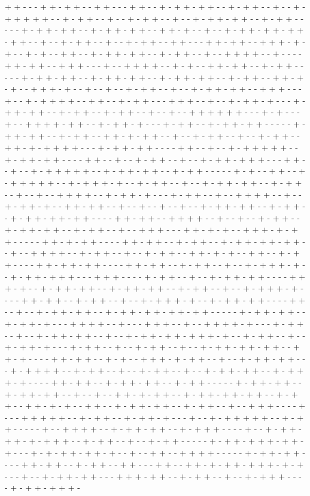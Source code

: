 + + - - - + + - + + - - + + - - - + + - - + - + + - + + - - + - + + - - + - - + - + + + + + - - + - + + - - + - - + - + + - - + - - + - + + - + + - - + - + + - - - - - + - + + - + + - - + - + + - + + - - + + - + - - + - - + - + + - + + - + + - + + - - + - - + - + + - - + - - + - + + - - + + - - - + + - + + - - + + + - + - + - - + - + - - + + - - + - + + - + + - - + - + + - - + - - + + + + - - + - - - - + + - + + - - + + + - - - + - - + + + + - - + - + - - + + - + + - - + - + + - - - - - + - + + - + + - - + - + + - + + - - + - + + - + + - - + - + + - - + + - + - + - - + + + - + - - + - - + - - + - + + - - + - - + - + + - + + - - + + + - - - + - - + - + + + + - - + + - - + - + + - - - + + + - - + - - + - + + - + - - - + - + + - + + - - + - + + - - + - + + - - + - - + - - + + + + + + - - - + - + - - - + - - + + + + - + + - - + - + + - + - - - + - + + - - + - + + - + + - - - - - + - + + - + + - - + - + + - - + + - + - + + - - + - - + - + + - - + - - + - + + - - + + - + - + + + + - - - + - + + - + + - - - - + + - - + - - + - + + + + + - - + - + + - + + - - - - + + - - + - - + - + + - - + - - + - + + - + + + - - - + + - - + - - + - + + + + + - - + - + + - + + - - + - + + - - - - - + - + - - + + - - + - + + + + + - - + - + + + - + - - + - + + - - + - - + - + + - + + - - + - + + - - + - - + - - + + + + - - + - + + - + - - - + - + + - - + - - + + + + - - + - - + - + + - + - - + + - + + - - + - - + - - + - - + - - + - + + - + + - - + - + + - - + - + + - + + - + + - - - - + + - + + - - + + + + - - + - - + - - + - + + - - + - + + - + + - - + - + + - - + - - + + + - - - + + - + - + - - + + + - + - + + - - - - - + + - + - + + - - - - + + - + + - - + - + + - - + - + + - + + - + + - - + - - + + + + - - + - + + - - + - - + - + + - - + + - + - + - - + + - - + - + + - - - - + + - + + - + + - - - - + + - + + - - + - + + - - + - - + - + + + - + - - + - + + - + + + - - - + + + - - - - + - + + - - + - - + - + + - + + - - - - + + + - + - - + - + + - + + - - + - + + - + + - - + - + + - - + - - + - + + + - + - - - - + + - + + - - + - + + - - + - - + - + + + - + - - + - + + - + + - - - - + + - - + - - + - + + - + + - - + - + + - + + - + + - + + - - - - - + - + + - + + - - + - + + - + - - - + + + + - - + - - - + + + - - + - - + + + + - + - - - + - + + - - + - - + - + + - + + - - + - - + - + + - + + - + + + - + - - + - + + - - + - - + - + + - + - - - + - + + - - + - - + - + + - - + - - + - + + - + + - + + - - + + - + - - - - + + - + + - - + - + - - + + + - + - + + - - + - - + - + + - + + - - - + - + + + + - - + - + + - - + - - + - + + - - + - - + - + + - + + - - + - + + + - + - - - - + + - + + - - + - + + - + + - - + - + + - - - - - + - + + - + + - - + - + + - + + - - + - - + - - + + - + - + + - - + - + + - + + - + + - - + - + + - - + + - + - + - - + + - - + - + + - + + - - + - + + - - + - - + + + - - - - + - - - + + + + + - - + - + + - - + - + + - + - - - + - - + - + + + + + - - + - + + - - - - - + - - + + + + - - + - + + - + + - - + - + + + - - - - + - - + - + + - + + - + - + + + - - + - + + - - + - - + - + + - - - - - + - + + - + + + - + + - + - - - + - + - + + - + + - + - - + - - + + - - + + + + - - - - - + - + + - + + - - - - + + - + + - - + - + + - - + + - - - + + - - + + - + - + + - + + + - + - + - - - + - - + - + + - + + - - - + + + - + + - - + - + + - - + - - + - + + + - - - - + - + + - + + + - 